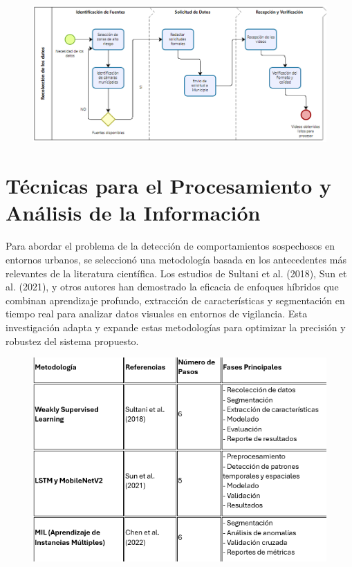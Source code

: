 \documentclass[listof=nochaptergap,12pt,times,authoryear]{report}
\begin{document}
\begin{figure}[h] %
    \centering
    \includegraphics[width=1.0\textwidth]{proc.png} %
    \label{fig:ejemplo} %
\end{figure}

\chapter{Técnicas para el Procesamiento y Análisis de la Información}
Para abordar el problema de la detección de comportamientos sospechosos en entornos urbanos, se seleccionó una metodología basada en los antecedentes más relevantes de la literatura científica. Los estudios de Sultani et al. (2018), Sun et al. (2021), y otros autores han demostrado la eficacia de enfoques híbridos que combinan aprendizaje profundo, extracción de características y segmentación en tiempo real para analizar datos visuales en entornos de vigilancia. Esta investigación adapta y expande estas metodologías para optimizar la precisión y robustez del sistema propuesto.


\begin{figure}[h] %
    \centering
    \includegraphics[width=1.0\textwidth]{proceso.png} %
    \label{fig:ejemplo} %
\end{figure}
\end{document}
